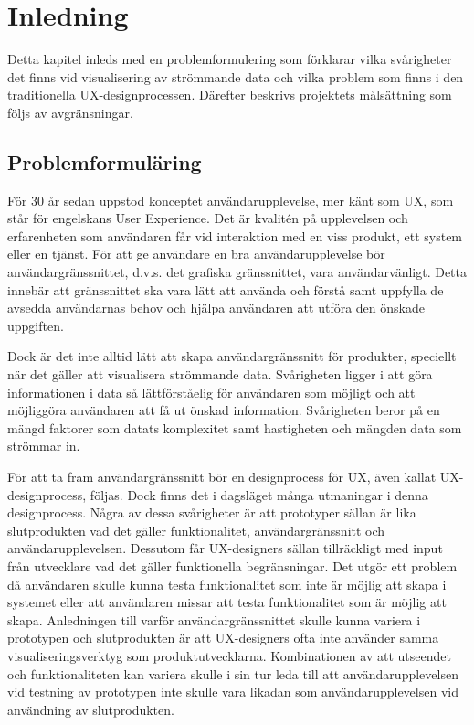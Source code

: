 \documentclass[12pt]{kththesis}
\begin{document}
\afterpage{\null\newpage}

\renewcommand{\contentsname}{Innehållsförteckning}

\tableofcontents


\mainmatter

\afterpage{\null\newpage}


\chapter{Inledning}
Detta kapitel inleds med en problemformulering som förklarar vilka svårigheter det finns vid visualisering av strömmande data och vilka problem som finns i den traditionella UX-designprocessen. Därefter beskrivs projektets målsättning som följs av avgränsningar.
\section{Problemformuläring}
För 30 år sedan uppstod konceptet användarupplevelse, mer känt som UX, som står för engelskans User Experience. Det är kvalitén på upplevelsen och erfarenheten som användaren får vid interaktion med en viss produkt, ett system eller en tjänst. För att ge användare en bra användarupplevelse bör användargränssnittet, d.v.s. det grafiska gränssnittet, vara användarvänligt. Detta innebär att gränssnittet ska vara lätt att använda och förstå samt uppfylla de avsedda användarnas behov och hjälpa användaren att utföra den önskade uppgiften. 

Dock är det inte alltid lätt att skapa användargränssnitt för produkter, speciellt när det gäller att visualisera strömmande data. Svårigheten ligger i att göra informationen i data så lättförståelig för användaren som möjligt och att möjliggöra användaren att få ut önskad information. Svårigheten beror på en mängd faktorer som datats komplexitet samt hastigheten och mängden data som strömmar in. 

För att ta fram användargränssnitt bör en designprocess för UX, även kallat UX-designprocess, följas. Dock finns det i dagsläget många utmaningar i denna designprocess. Några av dessa svårigheter är att prototyper sällan är lika slutprodukten vad det gäller funktionalitet, användargränssnitt och användarupplevelsen. Dessutom får UX-designers sällan tillräckligt med input från utvecklare vad det gäller funktionella begränsningar. Det utgör ett problem då användaren skulle kunna testa funktionalitet som inte är möjlig att skapa i systemet eller att användaren missar att testa funktionalitet som är möjlig att skapa. Anledningen till varför användargränssnittet skulle kunna variera i prototypen och slutprodukten är att UX-designers ofta inte använder samma visualiseringsverktyg som produktutvecklarna. Kombinationen av att utseendet och funktionaliteten kan variera skulle i sin tur leda till att användarupplevelsen vid testning av prototypen inte skulle vara likadan som användarupplevelsen vid användning av slutprodukten.  
\end{document}
